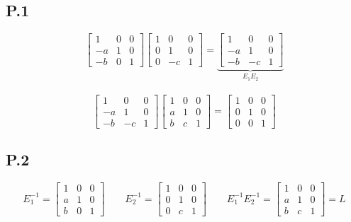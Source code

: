 \documentclass[9pt]{article}
\theoremstyle{plain}
\begin{document}
\subsection{P.1}
\[
	\begin{bmatrix}
		1  & 0 & 0 \\
		-a & 1 & 0 \\
		-b & 0 & 1
	\end{bmatrix}
	\begin{bmatrix}
		1 & 0  & 0 \\
		0 & 1  & 0 \\
		0 & -c & 1
	\end{bmatrix}
	=
	\underbrace{
		\begin{bmatrix}
			1  & 0  & 0 \\
			-a & 1  & 0 \\
			-b & -c & 1
		\end{bmatrix}}_{E_1E_2}
\]  \\
\[
	\begin{bmatrix}
		1  & 0  & 0 \\
		-a & 1  & 0 \\
		-b & -c & 1
	\end{bmatrix}
	\begin{bmatrix}
		1 & 0 & 0 \\
		a & 1 & 0 \\
		b & c & 1
	\end{bmatrix}  =
	\begin{bmatrix}
		1 & 0 & 0 \\
		0 & 1 & 0 \\
		0 & 0 & 1
	\end{bmatrix}
\]

\subsection{P.2}
\[
	E_1^{-1} =
	\begin{bmatrix}
		1 & 0 & 0 \\
		a & 1 & 0 \\
		b & 0 & 1
	\end{bmatrix} \quad\quad
	E_2^{-1} =
	\begin{bmatrix}
		1 & 0 & 0 \\
		0 & 1 & 0 \\
		0 & c & 1
	\end{bmatrix}  \quad\quad
	E_1^{-1}E_2^{-1} =
	\begin{bmatrix}
		1 & 0 & 0 \\
		a & 1 & 0 \\
		b & c & 1
	\end{bmatrix} = L
\]
\end{document}
